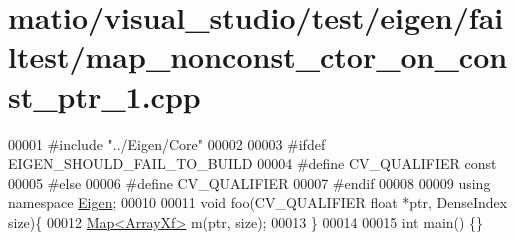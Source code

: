 \hypertarget{matio_2visual__studio_2test_2eigen_2failtest_2map__nonconst__ctor__on__const__ptr__1_8cpp_source}{}\section{matio/visual\+\_\+studio/test/eigen/failtest/map\+\_\+nonconst\+\_\+ctor\+\_\+on\+\_\+const\+\_\+ptr\+\_\+1.cpp}
\label{matio_2visual__studio_2test_2eigen_2failtest_2map__nonconst__ctor__on__const__ptr__1_8cpp_source}

\begin{DoxyCode}
00001 \textcolor{preprocessor}{#include "../Eigen/Core"}
00002 
00003 \textcolor{preprocessor}{#ifdef EIGEN\_SHOULD\_FAIL\_TO\_BUILD}
00004 \textcolor{preprocessor}{#define CV\_QUALIFIER const}
00005 \textcolor{preprocessor}{#else}
00006 \textcolor{preprocessor}{#define CV\_QUALIFIER}
00007 \textcolor{preprocessor}{#endif}
00008 
00009 \textcolor{keyword}{using namespace }\hyperlink{namespace_eigen}{Eigen};
00010 
00011 \textcolor{keywordtype}{void} foo(CV\_QUALIFIER \textcolor{keywordtype}{float} *ptr, DenseIndex size)\{
00012     \hyperlink{group___core___module_class_eigen_1_1_map}{Map<ArrayXf>} m(ptr, size);
00013 \}
00014 
00015 \textcolor{keywordtype}{int} main() \{\}
\end{DoxyCode}
